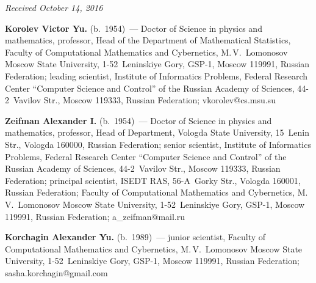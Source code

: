 \vspace*{-3pt}

\hfill{\small\textit{Received October 14, 2016}}

\Contr

\noindent
\textbf{Korolev Victor Yu.} (b.\ 1954)~---
Doctor of Science in physics and mathematics, professor, Head of the Department 
of Mathematical Statistics, 
Faculty of Computational Mathematics and Cybernetics, 
M.\,V.~Lomonosov Moscow State University, 1-52~Leninskiye Gory, GSP-1, 
Moscow 119991, Russian Federation; leading scientist, Institute of Informatics 
Problems, Federal Research Center ``Computer Science and Control'' 
of the Russian Academy of Sciences, 44-2~Vavilov Str., Moscow 119333,  
Russian Federation; \mbox{vkorolev@cs.msu.su} 

\vspace*{3pt} 

\noindent
\textbf{Zeifman Alexander I.} (b.\ 1954)~---
Doctor of Science in physics and mathematics, professor, Head of Department, 
Vologda State University, 15~Lenin Str., Vologda 160000, Russian Federation; 
senior scientist, Institute of Informatics Problems, Federal Research Center 
``Computer Science and Control'' of the Russian Academy of Sciences, 
44-2~Vavilov Str., Moscow 119333, Russian Federation; 
principal scientist, ISEDT RAS, 56-A~Gorky Str., Vologda 160001, 
Russian Federation; Faculty of Computational Mathematics and Cybernetics, 
M.\,V.~Lomonosov Moscow State University, 1-52~Leninskiye Gory, GSP-1, 
Moscow 119991, Russian Federation; \mbox{a\_zeifman@mail.ru}

 \vspace*{3pt}
 
 \noindent
 \textbf{Korchagin Alexander Yu.} (b.\ 1989)~---
 junior scientist, Faculty of Computational Mathematics and Cybernetics, 
 M.\,V.~Lomonosov Moscow State University, 1-52~Leninskiye Gory, GSP-1, 
 Moscow 119991, Russian Federation; \mbox{sasha.korchagin@gmail.com}
\label{end\stat}


\renewcommand{\bibname}{\protect\rm Литература} 